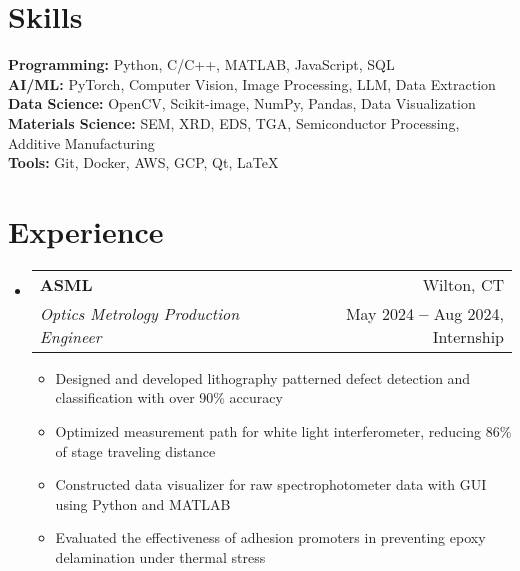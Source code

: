 \documentclass[a4paper,11pt]{article}
\makeatletter
\newcommand{\resumeItem}[1]{
  \item\small{
    {#1 \vspace{-2pt}}
  }
}
\newcommand{\resumeDoubleHeading}[4]{
  \vspace{-2pt}\item
    \begin{tabular*}{0.97\textwidth}[t]{l@{\extracolsep{\fill}}r}
        \textbf{#1} & #2 \\
        \textit{\small#3} & {\small #4} \\
    \end{tabular*}\vspace{-5pt}
}
\newcommand{\resumeSubHeadingListStart}{\begin{itemize}[leftmargin=0.15in, label={}]}
\newcommand{\resumeSubHeadingListEnd}{\end{itemize}}
\newcommand{\resumeItemListStart}{\begin{itemize}}
\newcommand{\resumeItemListEnd}{\end{itemize}\vspace{-5pt}}
\makeatother
\begin{document}
\section{Skills}
  \vspace{2pt}
  \resumeSubHeadingListStart
    \small{\item{
        \textbf{Programming:}{ Python, C/C++, MATLAB, JavaScript, SQL } \\ 
        \vspace{3pt}
        \textbf{AI/ML:}{ PyTorch, Computer Vision, Image Processing, LLM, Data Extraction } \\
        \vspace{3pt}
        \textbf{Data Science:}{ OpenCV, Scikit-image, NumPy, Pandas, Data Visualization } \\ 
        \vspace{3pt}
        \textbf{Materials Science:}{ SEM, XRD, EDS, TGA, Semiconductor Processing, Additive Manufacturing } \\ 
        \vspace{3pt}
        \textbf{Tools:}{ Git, Docker, AWS, GCP, Qt, LaTeX } \\
    }}
  \resumeSubHeadingListEnd



\section{Experience}
  \vspace{3pt}
  \resumeSubHeadingListStart
    \resumeDoubleHeading
      {ASML}{Wilton, CT}
      {Optics Metrology Production Engineer}{May 2024 \textbf{--} Aug 2024, Internship}
        \resumeItemListStart
            \resumeItem{Designed and developed lithography patterned defect detection and classification with over 90\% accuracy}
            \resumeItem{Optimized measurement path for white light interferometer, reducing 86\% of stage traveling distance}
            \resumeItem{Constructed data visualizer for raw spectrophotometer data with GUI using Python and MATLAB}
            \resumeItem{Evaluated the effectiveness of adhesion promoters in preventing epoxy delamination under thermal stress}
        \resumeItemListEnd
    
  \resumeSubHeadingListEnd

\end{document}
